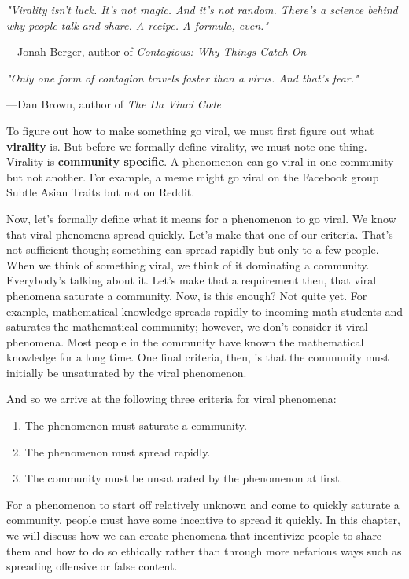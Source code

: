 \documentclass[class=book, crop=false]{standalone}
\providecommand{\keyterm}[1]{\textbf{#1}\marginnote{\scriptsize \textbf{#1}}}
\begin{document}
\epigraph{\itshape "Virality isn't luck. It's not magic. And it's not random. There's a science behind why people talk and share. A recipe. A formula, even."}{---Jonah Berger, author of \textit{Contagious: Why Things Catch On}}

\epigraph{\itshape "Only one form of contagion travels faster than a virus. And that's fear."}{---Dan Brown, author of \textit{The Da Vinci Code}}

To figure out how to make something go viral, we must first figure out what \keyterm{virality} is. But before we formally define virality, we must note one thing. Virality is \textbf{community specific}. A phenomenon can go viral in one community but not another. For example, a meme might go viral on the Facebook group Subtle Asian Traits but not on Reddit.

Now, let's formally define what it means for a phenomenon to go viral. We know that viral phenomena spread quickly. Let's make that one of our criteria. That's not sufficient though; something can spread rapidly but only to a few people. When we think of something viral, we think of it dominating a community. Everybody's talking about it. Let's make that a requirement then, that viral phenomena saturate a community. Now, is this enough? Not quite yet. For example, mathematical knowledge spreads rapidly to incoming math students and saturates the mathematical community; however, we don't consider it viral phenomena. Most people in the community have known the mathematical knowledge for a long time. One final criteria, then, is that the community must initially be unsaturated by the viral phenomenon.

And so we arrive at the following three criteria for viral phenomena:
\begin{enumerate}
    \item The phenomenon must saturate a community.
    \item The phenomenon must spread rapidly.
    \item The community must be unsaturated by the phenomenon at first.
\end{enumerate}

For a phenomenon to start off relatively unknown and come to quickly saturate a community, people must have some incentive to spread it quickly. In this chapter, we will discuss how we can create phenomena that incentivize people to share them and how to do so ethically rather than through more nefarious ways such as spreading offensive or false content.
\end{document}
